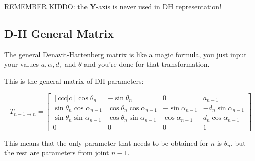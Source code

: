 \documentclass[titlepage, letterpaper, fleqn]{article}
\let\bs\mathbf
\begin{document}
\begin{tcolorbox}
REMEMBER KIDDO: the $\bs{Y}$-axis is never used in DH representation!
\end{tcolorbox}

\subsection{D-H General Matrix} %
\label{sec:d_h_general_matrix}

The general Denavit-Hartenberg matrix is like a magic formula,
you just input your values $a, \alpha, d,$ and $\theta$ and you're done for that transformation.

This is the general matrix of DH parameters:

\begin{equation}
    \label{eq:general_DH}
    T_{n-1 \to n} =
    \begin{bmatrix}[ccc|c]
    \cos \theta_n & -\sin \theta_n & 0 & a_{n-1} \\
    \sin \theta_n \cos\alpha_{n-1} & \cos \theta_n \cos \alpha_{n-1} & - \sin \alpha_{n-1} & -d_n \sin \alpha_{n-1} \\
    \sin \theta_n \sin \alpha_{n-1} & \cos \theta_n \sin\alpha_{n-1} & \cos \alpha_{n-1} & d_n \cos \alpha_{n-1} \\ \hline
    0 & 0 & 0 & 1
    \end{bmatrix}
\end{equation}

This means that the only parameter that needs to be obtained for $n$ is $\theta_n$,
but the rest are parameters from joint $n-1$.


\end{document}
